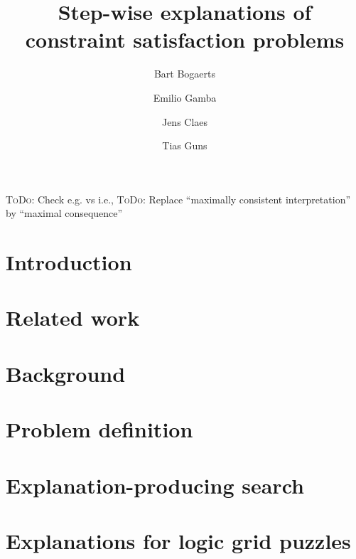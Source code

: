 \documentclass{ecai}
\newcommand\todo[1]{{\color{pink}\textsc{ToDo}: #1}}
\begin{document}
\title{Step-wise explanations of constraint satisfaction problems}

\author{Bart Bogaerts \and Emilio Gamba\footnotemark[1] \and Jens Claes \and Tias Guns\footnotemark[1] }

\maketitle


\begin{abstract}

\end{abstract}

\todo{Check e.g. vs i.e., }
\todo{Replace ``maximally consistent interpretation'' by ``maximal consequence''}


\section{Introduction}


\section{Related work}


\section{Background}


\section{Problem definition}



\section{Explanation-producing search}\label{sec:expl-gen-prod}



\section{Explanations for logic grid puzzles}\label{sec:zebra}

\end{document}
